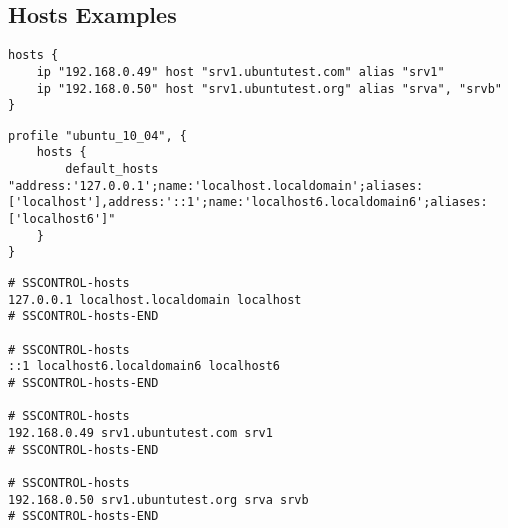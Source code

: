 \subsection{Hosts Examples}

\begin{lstlisting}[style=Sscontrol,
label={lst:hosts_example_script},
title={Adds IP addresses and the host name.}]
hosts {
    ip "192.168.0.49" host "srv1.ubuntutest.com" alias "srv1"
    ip "192.168.0.50" host "srv1.ubuntutest.org" alias "srva", "srvb"
}
\end{lstlisting}

\begin{lstlisting}[style=Sscontrol,
label={lst:hosts_ubuntu_profile},
title={Sets default list of hosts.}]
profile "ubuntu_10_04", {
    hosts {
        default_hosts "address:'127.0.0.1';name:'localhost.localdomain';aliases:['localhost'],address:'::1';name:'localhost6.localdomain6';aliases:['localhost6']"
    }
}
\end{lstlisting}

\begin{lstlisting}[style=rcfile_nonumbers,
label={lst:hosts_example},
title={Example hosts configuration file.}]
# SSCONTROL-hosts
127.0.0.1 localhost.localdomain localhost
# SSCONTROL-hosts-END

# SSCONTROL-hosts
::1 localhost6.localdomain6 localhost6
# SSCONTROL-hosts-END

# SSCONTROL-hosts
192.168.0.49 srv1.ubuntutest.com srv1
# SSCONTROL-hosts-END

# SSCONTROL-hosts
192.168.0.50 srv1.ubuntutest.org srva srvb
# SSCONTROL-hosts-END
\end{lstlisting}

